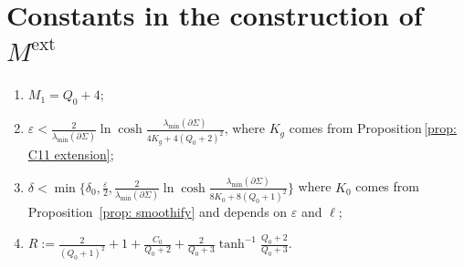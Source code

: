 \documentclass[10pt]{amsart}
\newcommand{\ext}{\mathrm{ext}}
\theoremstyle{definition}
\let\eps\varepsilon
\renewcommand{\>}{{\rangle}}
\newcommand{\<}{{\langle}}
\let\dpl\displaystyle
\begin{document}
\section{Constants in the construction of \texorpdfstring{$M^{\ext}$}{M}} \label{app: const_in_M_ext}

\begin{enumerate}\renewcommand{\theenumi}{C\arabic{enumi}}
\item  $M_1=Q_0+4$;
\item \label{cond: eps2} $\dpl\eps\!<\!\frac{2}{\lambda_{\min}(\partial\Sigma)}\!\ln\cosh\!\frac{\lambda_{\min}(\partial\Sigma)}{4K_g+4(Q_0+2)^2}$, where $K_g$ comes from \hbox{Proposition}\,\ref{prop: C11 extension};
\item\label{cond: delta2} $\dpl\delta<\min\{\delta_0,\frac{\eps}{2},\frac{2}{\lambda_{\min}(\partial\Sigma)}\ln\cosh\frac{\lambda_{\min}(\partial\Sigma)}{8K_0+8(Q_0+1)^2}\}$ where $K_0$ comes from Proposition~\ref{prop: smoothify} and depends on $\eps$ and $\ell$;
\item $\dpl R:=\frac{2}{(Q_0+1)^2}+1+\frac{C_0}{Q_0+2}+\frac{2}{Q_0+3}\tanh^{-1}\frac{Q_0+2}{Q_0+3}.$
\end{enumerate}
\end{document}
